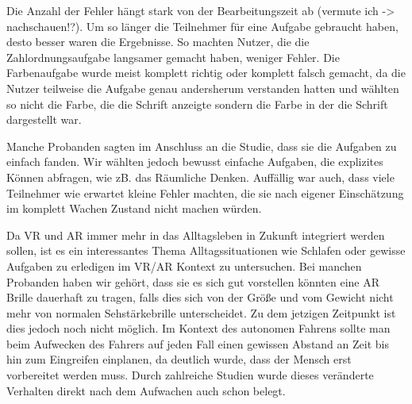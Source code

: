 Die Anzahl der Fehler hängt stark von der Bearbeitungszeit ab (vermute ich -> nachschauen!?). Um so länger die Teilnehmer für eine Aufgabe gebraucht haben, desto besser waren die Ergebnisse. So machten Nutzer, die die Zahlordnungsaufgabe langsamer gemacht haben, weniger Fehler. Die Farbenaufgabe wurde meist komplett richtig oder komplett falsch gemacht, da die Nutzer teilweise die Aufgabe genau andersherum verstanden hatten und wählten so nicht die Farbe, die die Schrift anzeigte sondern die Farbe in der die Schrift dargestellt war.

Manche Probanden sagten im Anschluss an die Studie, dass sie die Aufgaben zu einfach fanden. Wir wählten jedoch bewusst einfache Aufgaben, die explizites Können abfragen, wie zB. das Räumliche Denken. Auffällig war auch, dass viele Teilnehmer wie erwartet kleine Fehler machten, die sie nach eigener Einschätzung im komplett Wachen Zustand nicht machen würden. 



Da VR und AR immer mehr in das Alltagsleben in Zukunft integriert werden sollen, ist es ein interessantes Thema Alltagssituationen wie Schlafen oder gewisse Aufgaben zu erledigen im VR/AR Kontext zu untersuchen. Bei manchen Probanden haben wir gehört, dass sie es sich gut vorstellen könnten eine AR Brille dauerhaft zu tragen, falls dies sich von der Größe und vom Gewicht nicht mehr von normalen Sehstärkebrille unterscheidet. Zu dem jetzigen Zeitpunkt ist dies jedoch noch nicht möglich.
Im Kontext des autonomen Fahrens sollte man beim Aufwecken des Fahrers auf jeden Fall einen gewissen Abstand an Zeit bis hin zum Eingreifen einplanen, da deutlich wurde, dass der Mensch erst vorbereitet werden muss. Durch zahlreiche Studien wurde dieses veränderte Verhalten direkt nach dem Aufwachen auch schon belegt.


